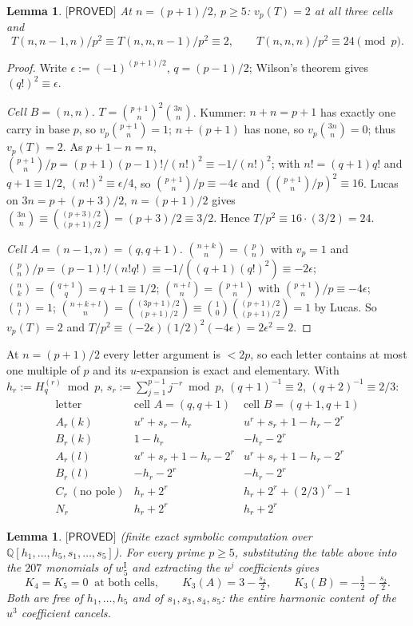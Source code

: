 \documentclass[11pt,reqno]{amsart}
\theoremstyle{plain}
\newtheorem{lemma}[theorem]{Lemma}
\theoremstyle{definition}
\theoremstyle{remark}
\numberwithin{equation}{section}
\newcommand{\QQ}{\mathbb{Q}}
\newcommand{\PROVED}{\textsf{[PROVED]}}
\begin{document}
\begin{lemma}\label{lem:Tcorner}
$\PROVED$ At $n=(p+1)/2$, $p\ge5$: $v_p(T)=2$ at all three cells and
\[
T(n,n-1,n)/p^2\equiv T(n,n,n-1)/p^2\equiv2,\qquad T(n,n,n)/p^2\equiv24 \pmod p .
\]
\end{lemma}

\begin{proof}
Write $\epsilon:=(-1)^{(p+1)/2}$, $q=(p-1)/2$; Wilson's theorem gives $(q!)^2\equiv\epsilon$.

\emph{Cell $B=(n,n)$.} $T=\binom{p+1}{n}^2\binom{3n}{n}$. Kummer: $n+n=p+1$ has exactly one
carry in base $p$, so $v_p\binom{p+1}{n}=1$; $n+(p+1)$ has none, so $v_p\binom{3n}{n}=0$; thus
$v_p(T)=2$. As $p+1-n=n$, $\binom{p+1}{n}/p=(p+1)(p-1)!/(n!)^2\equiv-1/(n!)^2$; with
$n!=(q+1)q!$ and $q+1\equiv1/2$, $(n!)^2\equiv\epsilon/4$, so $\binom{p+1}{n}/p\equiv-4\epsilon$
and $(\binom{p+1}{n}/p)^2\equiv16$. Lucas on $3n=p+(p+3)/2$, $n=(p+1)/2$ gives
$\binom{3n}{n}\equiv\binom{(p+3)/2}{(p+1)/2}=(p+3)/2\equiv3/2$. Hence
$T/p^2\equiv16\cdot(3/2)=24$.

\emph{Cell $A=(n-1,n)=(q,q+1)$.} $\binom{n+k}{n}=\binom pn$ with $v_p=1$ and
$\binom pn/p=(p-1)!/(n!q!)\equiv-1/((q+1)(q!)^2)\equiv-2\epsilon$; $\binom nk=\binom{q+1}{q}=q+1\equiv1/2$;
$\binom{n+l}{n}=\binom{p+1}{n}$ with $\binom{p+1}{n}/p\equiv-4\epsilon$; $\binom nl=1$;
$\binom{n+k+l}{n}=\binom{(3p+1)/2}{(p+1)/2}\equiv\binom10\binom{(p+1)/2}{(p+1)/2}=1$ by Lucas.
So $v_p(T)=2$ and $T/p^2\equiv(-2\epsilon)(1/2)^2(-4\epsilon)=2\epsilon^2=2$.
\end{proof}

At $n=(p+1)/2$ every letter argument is $<2p$, so each letter contains at most one multiple of
$p$ and its $u$-expansion is exact and elementary. With $h_r:=H^{(r)}_q\bmod p$,
$s_r:=\sum_{j=1}^{p-1}j^{-r}\bmod p$, $(q+1)^{-1}\equiv2$, $(q+2)^{-1}\equiv2/3$:
\[
\begin{array}{lll}
\text{letter} & \text{cell } A=(q,q+1) & \text{cell } B=(q+1,q+1)\\\hline
A_r(k) & u^r+s_r-h_r & u^r+s_r+1-h_r-2^r\\
B_r(k) & 1-h_r & -h_r-2^r\\
A_r(l) & u^r+s_r+1-h_r-2^r & u^r+s_r+1-h_r-2^r\\
B_r(l) & -h_r-2^r & -h_r-2^r\\
C_r\ (\text{no pole}) & h_r+2^r & h_r+2^r+(2/3)^r-1\\
N_r & h_r+2^r & h_r+2^r
\end{array}
\]

\begin{lemma}\label{lem:K3}
$\PROVED$ (finite exact symbolic computation over $\QQ[h_1,\dots,h_5,s_1,\dots,s_5]$). For every
prime $p\ge5$, substituting the table above into the $207$ monomials of $w_5^{\mathrm I}$ and
extracting the $u^j$ coefficients gives
\[
K_4=K_5=0\ \text{ at both cells},\qquad K_3(A)=3-\tfrac{s_2}{2},\qquad K_3(B)=-\tfrac12-\tfrac{s_2}{2}.
\]
Both are \emph{free of $h_1,\dots,h_5$ and of $s_1,s_3,s_4,s_5$}: the entire harmonic content of
the $u^3$ coefficient cancels.
\end{lemma}
\end{document}
